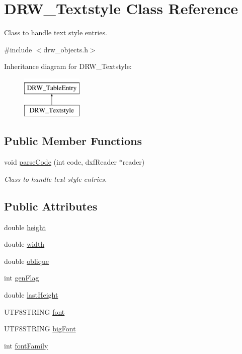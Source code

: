 \hypertarget{class_d_r_w___textstyle}{}\section{D\+R\+W\+\_\+\+Textstyle Class Reference}
\label{class_d_r_w___textstyle}


Class to handle text style entries.  




{\ttfamily \#include $<$drw\+\_\+objects.\+h$>$}

Inheritance diagram for D\+R\+W\+\_\+\+Textstyle\+:\begin{figure}[H]
\begin{center}
\leavevmode
\includegraphics[height=2.000000cm]{df/d54/class_d_r_w___textstyle}
\end{center}
\end{figure}
\subsection*{Public Member Functions}
\begin{DoxyCompactItemize}
\item 
void \hyperlink{class_d_r_w___textstyle_a05f7de5ef7082ac33bbc61908dfc7c24}{parse\+Code} (int code, dxf\+Reader $\ast$reader)
\begin{DoxyCompactList}\small\item\em Class to handle text style entries. \end{DoxyCompactList}\end{DoxyCompactItemize}
\subsection*{Public Attributes}
\begin{DoxyCompactItemize}
\item 
double \hyperlink{class_d_r_w___textstyle_a23809c13d923ae1ae43dc83c2f200e47}{height}
\item 
double \hyperlink{class_d_r_w___textstyle_a36bce344a959c198199e88482ede075a}{width}
\item 
double \hyperlink{class_d_r_w___textstyle_a5d133a89292ecc76b6a66af88039c6cc}{oblique}
\item 
int \hyperlink{class_d_r_w___textstyle_adec337333f98e34908076b2b1a0a10a0}{gen\+Flag}
\item 
double \hyperlink{class_d_r_w___textstyle_ad7c6c347da9dfa658fabeeb46e430da4}{last\+Height}
\item 
U\+T\+F8\+S\+T\+R\+I\+N\+G \hyperlink{class_d_r_w___textstyle_ac04f9a321fbb47a3adc3aaf65b30f02b}{font}
\item 
U\+T\+F8\+S\+T\+R\+I\+N\+G \hyperlink{class_d_r_w___textstyle_a5e5bee24192efcdc25e2922c2639a73e}{big\+Font}
\item 
int \hyperlink{class_d_r_w___textstyle_a40ef37c402a0f1b75f481be925c85357}{font\+Family}
\end{DoxyCompactItemize}
